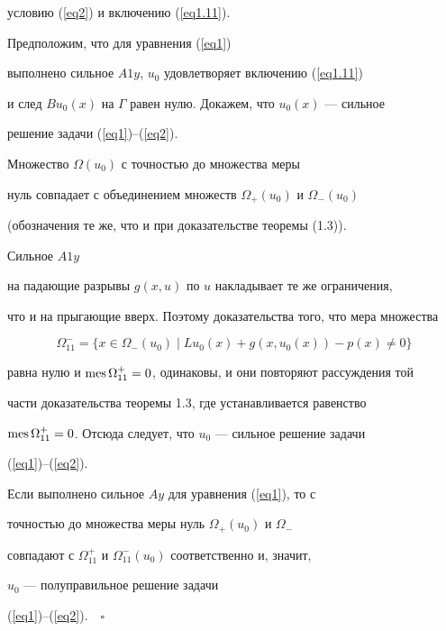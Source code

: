 условию (\ref{eq2}) и включению (\ref{eq1.11}).


Предположим, что для уравнения (\ref{eq1})


выполнено сильное $A1y$, $u_0$ удовлетворяет включению (\ref{eq1.11})


и след $Bu_0(x)$ на $\Gamma$ равен нулю. Докажем, что $u_0(x)$ --- сильное


решение задачи (\ref{eq1})--(\ref{eq2}).


Множество $\Omega(u_0)$ с точностью до множества меры


нуль совпадает с объединением множеств $\Omega_{+}(u_0)$ и $\Omega_{-}(u_0)$


(обозначения те же, что и при доказательстве теоремы (1.3)).


Сильное $A1y$


на падающие разрывы $g(x,u)$ по $u$ накладывает те же ограничения,


что и на прыгающие вверх. Поэтому доказательства того, что мера множества


$$


\Omega_{11}^-=\{x \in \Omega_{-}(u_0) \mid Lu_0(x)+g(x,u_0(x))-p(x) \ne 0\}


$$


равна нулю и $\operatorname{mes}\Omega_{11}^+=0$, одинаковы, и они повторяют рассуждения той


части доказательства теоремы 1.3, где устанавливается равенство


$\operatorname{mes}\Omega_{11}^+=0$. Отсюда следует, что $u_0$ --- сильное решение задачи


(\ref{eq1})--(\ref{eq2}).


Если выполнено сильное $Ay$ для уравнения (\ref{eq1}), то с


точностью до множества меры нуль $\Omega_{+}(u_0)$ и $\Omega_{-}$


совпадают с $\Omega_{11}^+$ и $\Omega_{11}^-(u_0)$ соответственно и, значит,


$u_0$ --- полуправильное решение задачи


(\ref{eq1})--(\ref{eq2})$.\quad\square$





